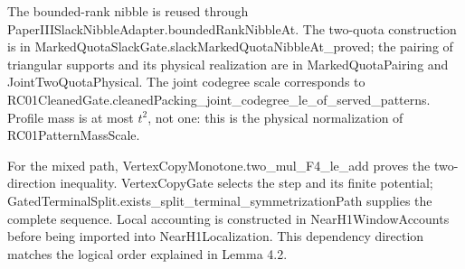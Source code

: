 \documentclass[english,11pt,a4paper]{article}
\begin{document}
The bounded-rank nibble is reused through {\ttfamily\small PaperIIISlac\discretionary{\hbox{\ensuremath{\hookrightarrow}}}{}{}kNibbleAdapt\discretionary{\hbox{\ensuremath{\hookrightarrow}}}{}{}er.\discretionary{\hbox{\ensuremath{\hookrightarrow}}}{}{}boundedRankN\discretionary{\hbox{\ensuremath{\hookrightarrow}}}{}{}ibbleAt}. The two-quota construction is in {\ttfamily\small MarkedQuotaS\discretionary{\hbox{\ensuremath{\hookrightarrow}}}{}{}lackGate.\discretionary{\hbox{\ensuremath{\hookrightarrow}}}{}{}slackMarkedQ\discretionary{\hbox{\ensuremath{\hookrightarrow}}}{}{}uotaNibbleAt\discretionary{\hbox{\ensuremath{\hookrightarrow}}}{}{}\_\discretionary{\hbox{\ensuremath{\hookrightarrow}}}{}{}proved}; the pairing of triangular supports and its physical realization are in {\ttfamily\small MarkedQuotaP\discretionary{\hbox{\ensuremath{\hookrightarrow}}}{}{}airing} and {\ttfamily\small JointTwoQuot\discretionary{\hbox{\ensuremath{\hookrightarrow}}}{}{}aPhysical}. The joint codegree scale corresponds to {\ttfamily\small RC01CleanedG\discretionary{\hbox{\ensuremath{\hookrightarrow}}}{}{}ate.\discretionary{\hbox{\ensuremath{\hookrightarrow}}}{}{}cleanedPacki\discretionary{\hbox{\ensuremath{\hookrightarrow}}}{}{}ng\_\discretionary{\hbox{\ensuremath{\hookrightarrow}}}{}{}joint\_\discretionary{\hbox{\ensuremath{\hookrightarrow}}}{}{}codegree\_\discretionary{\hbox{\ensuremath{\hookrightarrow}}}{}{}le\_\discretionary{\hbox{\ensuremath{\hookrightarrow}}}{}{}of\_\discretionary{\hbox{\ensuremath{\hookrightarrow}}}{}{}served\_\discretionary{\hbox{\ensuremath{\hookrightarrow}}}{}{}patterns}. Profile mass is at most \(t^2\), not one: this is the physical normalization of {\ttfamily\small RC01PatternM\discretionary{\hbox{\ensuremath{\hookrightarrow}}}{}{}assScale}.

For the mixed path, {\ttfamily\small VertexCopyMo\discretionary{\hbox{\ensuremath{\hookrightarrow}}}{}{}notone.\discretionary{\hbox{\ensuremath{\hookrightarrow}}}{}{}two\_\discretionary{\hbox{\ensuremath{\hookrightarrow}}}{}{}mul\_\discretionary{\hbox{\ensuremath{\hookrightarrow}}}{}{}F4\_\discretionary{\hbox{\ensuremath{\hookrightarrow}}}{}{}le\_\discretionary{\hbox{\ensuremath{\hookrightarrow}}}{}{}add} proves the two-direction inequality. {\ttfamily\small VertexCopyGa\discretionary{\hbox{\ensuremath{\hookrightarrow}}}{}{}te} selects the step and its finite potential; {\ttfamily\small GatedTermina\discretionary{\hbox{\ensuremath{\hookrightarrow}}}{}{}lSplit.\discretionary{\hbox{\ensuremath{\hookrightarrow}}}{}{}exists\_\discretionary{\hbox{\ensuremath{\hookrightarrow}}}{}{}split\_\discretionary{\hbox{\ensuremath{\hookrightarrow}}}{}{}terminal\_\discretionary{\hbox{\ensuremath{\hookrightarrow}}}{}{}symmetrizati\discretionary{\hbox{\ensuremath{\hookrightarrow}}}{}{}onPath} supplies the complete sequence. Local accounting is constructed in {\ttfamily\small NearH1Window\discretionary{\hbox{\ensuremath{\hookrightarrow}}}{}{}Accounts} before being imported into {\ttfamily\small NearH1Locali\discretionary{\hbox{\ensuremath{\hookrightarrow}}}{}{}zation}. This dependency direction matches the logical order explained in Lemma 4.2.
\end{document}
